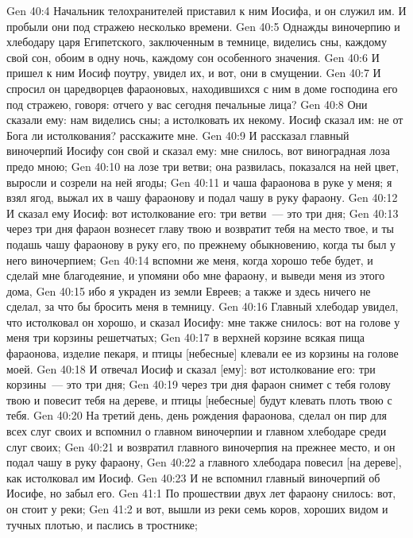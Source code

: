 \vs Gen 40:4 Начальник телохранителей приставил к ним Иосифа, и он служил им. И пробыли они под стражею несколько времени.
\rsbpar\vs Gen 40:5 Однажды виночерпию и хлебодару царя Египетского, заключенным в темнице, виделись сны, каждому свой сон, обоим в одну ночь, каждому сон особенного значения.
\vs Gen 40:6 И пришел к ним Иосиф поутру, увидел их, и вот, они в смущении.
\vs Gen 40:7 И спросил он царедворцев фараоновых, находившихся с ним в доме господина его под стражею, говоря: отчего у вас сегодня печальные лица?
\vs Gen 40:8 Они сказали ему: нам виделись сны; а истолковать их некому. Иосиф сказал им: не от Бога ли истолкования? расскажите мне.
\vs Gen 40:9 И рассказал главный виночерпий Иосифу сон свой и сказал ему: мне снилось, вот виноградная лоза предо мною;
\vs Gen 40:10 на лозе три ветви; она развилась, показался на ней цвет, выросли и созрели на ней ягоды;
\vs Gen 40:11 и чаша фараонова в руке у меня; я взял ягод, выжал их в чашу фараонову и подал чашу в руку фараону.
\vs Gen 40:12 И сказал ему Иосиф: вот истолкование его: три ветви~--- это три дня;
\vs Gen 40:13 через три дня фараон вознесет главу твою и возвратит тебя на место твое, и ты подашь чашу фараонову в руку его, по прежнему обыкновению, когда ты был у него виночерпием;
\vs Gen 40:14 вспомни же меня, когда хорошо тебе будет, и сделай мне благодеяние, и упомяни обо мне фараону, и выведи меня из этого дома,
\vs Gen 40:15 ибо я украден из земли Евреев; а также и здесь ничего не сделал, за что бы бросить меня в темницу.
\vs Gen 40:16 Главный хлебодар увидел, что истолковал он хорошо, и сказал Иосифу: мне также снилось: вот на голове у меня три корзины решетчатых;
\vs Gen 40:17 в верхней корзине всякая пища фараонова, изделие пекаря, и птицы [небесные] клевали ее из корзины на голове моей.
\vs Gen 40:18 И отвечал Иосиф и сказал [ему]: вот истолкование его: три корзины~--- это три дня;
\vs Gen 40:19 через три дня фараон снимет с тебя голову твою и повесит тебя на дереве, и птицы [небесные] будут клевать плоть твою с тебя.
\vs Gen 40:20 На третий день, день рождения фараонова, сделал он пир для всех слуг своих и вспомнил о главном виночерпии и главном хлебодаре среди слуг своих;
\vs Gen 40:21 и возвратил главного виночерпия на прежнее место, и он подал чашу в руку фараону,
\vs Gen 40:22 а главного хлебодара повесил [на дереве], как истолковал им Иосиф.
\vs Gen 40:23 И не вспомнил главный виночерпий об Иосифе, но забыл его.
\vs Gen 41:1 По прошествии двух лет фараону снилось: вот, он стоит у реки;
\vs Gen 41:2 и вот, вышли из реки семь коров, хороших видом и тучных плотью, и паслись в тростнике;
